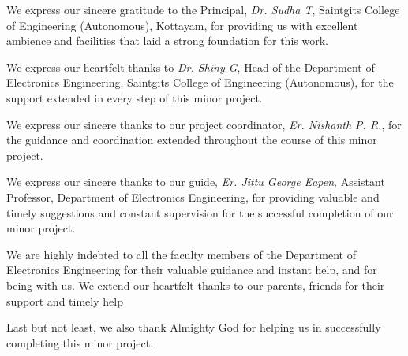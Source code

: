 \documentclass[12pt,a4paper,oneside]{report}
\begin{document}
\clearpage
\thispagestyle{plain}
{\setlength{\parskip}{10.71pt}%
\vspace*{11pt}
\vspace{29pt}

We express our sincere gratitude to the Principal, \textit{Dr. Sudha T}, Saintgits College of Engineering (Autonomous), Kottayam, for providing us with excellent ambience and facilities that laid a strong foundation for this work.

We express our heartfelt thanks to \textit{Dr. Shiny G}, Head of the Department of Electronics Engineering, Saintgits College of Engineering (Autonomous), for the support extended in every step of this minor project.

We express our sincere thanks to our project coordinator, \textit{Er. Nishanth P. R.}, for the guidance and coordination extended throughout the course of this minor project.

We express our sincere thanks to our guide, \textit{Er. Jittu George Eapen}, Assistant Professor, Department of Electronics Engineering, for providing valuable and timely suggestions and constant supervision for the successful completion of our minor project.

We are highly indebted to all the faculty members of the Department of Electronics Engineering for their valuable guidance and instant help, and for being with us. We extend our heartfelt thanks to our parents, friends for their support and timely help

Last but not least, we also thank Almighty God for helping us in successfully completing this minor project.\par}
\end{document}
